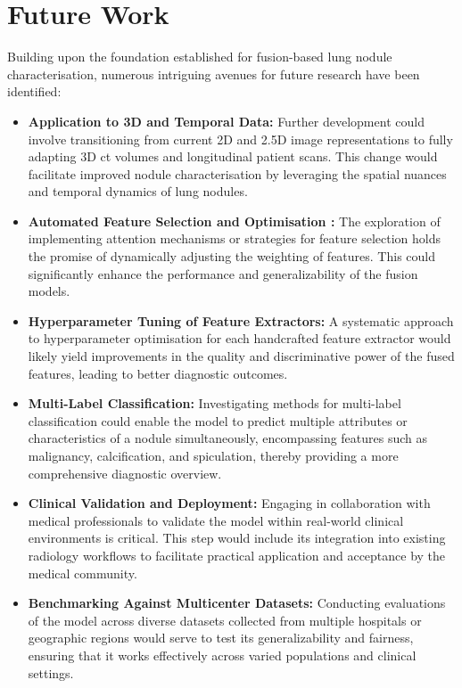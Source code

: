 \section{Future Work}

Building upon the foundation established for fusion-based lung nodule characterisation, numerous intriguing avenues for future research have been identified:

\begin{itemize}
    \item \textbf{Application to 3D and Temporal Data:} Further development could involve transitioning from current 2D and 2.5D image representations to fully adapting 3D \ac{ct} volumes and longitudinal patient scans. This change would facilitate improved nodule characterisation by leveraging the spatial nuances and temporal dynamics of lung nodules.

    \item \textbf{Automated Feature Selection and Optimisation :} The exploration of implementing attention mechanisms or strategies for feature selection holds the promise of dynamically adjusting the weighting of features. This could significantly enhance the performance and generalizability of the fusion models.

    \item \textbf{Hyperparameter Tuning of Feature Extractors:} A systematic approach to hyperparameter optimisation for each handcrafted feature extractor would likely yield improvements in the quality and discriminative power of the fused features, leading to better diagnostic outcomes.

    \item \textbf{Multi-Label Classification:} Investigating methods for multi-label classification could enable the model to predict multiple attributes or characteristics of a nodule simultaneously, encompassing features such as malignancy, calcification, and spiculation, thereby providing a more comprehensive diagnostic overview.

    \item \textbf{Clinical Validation and Deployment:} Engaging in collaboration with medical professionals to validate the model within real-world clinical environments is critical. This step would include its integration into existing radiology workflows to facilitate practical application and acceptance by the medical community.

    \item \textbf{Benchmarking Against Multicenter Datasets:} Conducting evaluations of the model across diverse datasets collected from multiple hospitals or geographic regions would serve to test its generalizability and fairness, ensuring that it works effectively across varied populations and clinical settings.
\end{itemize}
